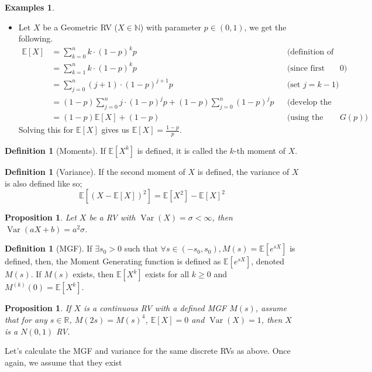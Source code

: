 \documentclass[paper=a4, fontsize=12pt]{scrartcl} %
\newtheorem{prop}[thm]{Proposition}
\theoremstyle{definition}
\newtheorem{defn}[thm]{Definition}
\newtheorem{exmps}[thm]{Examples}
\theoremstyle{remark}
\newcommand{\R}{\mathbb{R}}
\newcommand{\N}{\mathbb{N}}
\newcommand{\E}{\mathbb{E}}
\DeclareMathOperator{\vari}{Var}
\numberwithin{equation}{section} %
\numberwithin{figure}{section} %
\numberwithin{table}{section} %
\begin{document}
\begin{exmps}
\begin{itemize}
		\item Let $X$ be a Geometric RV ($X \in \N$) with parameter $p \in (0,1)$, we get the following.
		\begin{align*}
		\E[X] &= \sum_{k=0}^n k\cdot (1-p)^kp
		&&\mbox{(definition of expectation)}\\
		&= \sum_{k=1}^n k\cdot (1-p)^kp &&\mbox{(since first term is $0$)}\\
		&= \sum_{j = 0}^n (j+1)\cdot (1-p)^{j+1}p &&\mbox{(set $j = k-1$)}\\
		&= (1-p)\sum_{j = 0}^n j\cdot (1-p)^{j}p + (1-p)\sum_{j = 0}^n (1-p)^{j}p &&\mbox{(develop the sum)}\\
		&= (1-p)\E[X] + (1-p) &&\mbox{(using the sum of PMF of $G(p)$)}
		\end{align*}
		Solving this for $\E[X]$ gives us $\E[X] = \frac{1-p}{p}$.
	\end{itemize}
\end{exmps}
\begin{defn}[Moments]
	If $\E[X^k]$ is defined, it is called the $k$-th moment of $X$.
\end{defn}
\begin{defn}[Variance]
	If the second moment of $X$ is defined, the variance of $X$ is also defined like so;
	\[ \E[(X - \E[X])^2] = \E[X^2] - \E[X]^2 \]
\end{defn}
\begin{prop}
	Let $X$ be a RV with $\vari(X) = \sigma < \infty$, then $\vari(aX + b) = a^2\sigma$.
\end{prop}
\begin{defn}[MGF]
	If $\exists s_0>0$ such that $\forall s \in (-s_0, s_0), M(s) = \E[e^{sX}]$ is defined, then, the Moment Generating function is defined as $\E[e^{sX}]$, denoted $M(s)$. If $M(s)$ exists, then $\E[X^k]$ exists for all $k \geq 0$ and $M^{(k)}(0) = \E[X^k]$.
\end{defn}
\begin{prop}
	If $X$ is a continuous RV with a defined MGF $M(s)$, assume that for any $s \in \R$, $M(2s) = M(s)^4$, $\E[X] = 0$ and $\vari(X) = 1$, then $X$ is a $N(0,1)$ RV.
\end{prop}
Let's calculate the MGF and variance for the same discrete RVs as above. Once again, we assume that they exist 
\end{document}
